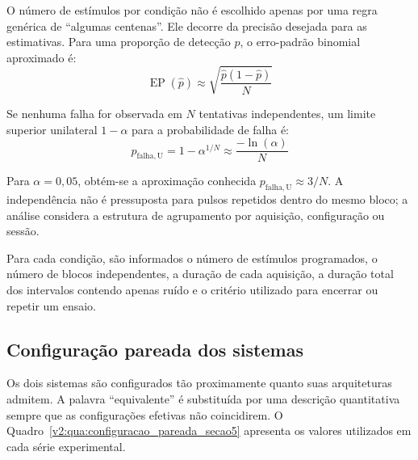 O número de estímulos por condição não é escolhido apenas por uma regra genérica de ``algumas centenas''. Ele decorre da precisão desejada para as estimativas. Para uma proporção de detecção \(p\), o erro-padrão binomial aproximado é:
\begin{equation}
	\operatorname{EP}\left(\widehat{p}\right) \approx \sqrt{\frac{\widehat{p}\left(1-\widehat{p}\right)}{N}}
	\label{v2:eq:erro_padrao_deteccao}
\end{equation}

Se nenhuma falha for observada em \(N\) tentativas independentes, um limite superior unilateral \(1-\alpha\) para a probabilidade de falha é:
\begin{equation}
	p_{\mathrm{falha,U}} = 1-\alpha^{1/N} \approx \frac{-\ln\left(\alpha\right)}{N}
	\label{v2:eq:limite_zero_falhas}
\end{equation}

Para \(\alpha=0{,}05\), obtém-se a aproximação conhecida \(p_{\mathrm{falha,U}}\approx 3/N\). A independência não é pressuposta para pulsos repetidos dentro do mesmo bloco; a análise considera a estrutura de agrupamento por aquisição, configuração ou sessão.

Para cada condição, são informados o número de estímulos programados, o número de blocos independentes, a duração de cada aquisição, a duração total dos intervalos contendo apenas ruído e o critério utilizado para encerrar ou repetir um ensaio.

\subsection{Configuração pareada dos sistemas}
\label{v2:subsec:configuracao_pareada}

Os dois sistemas são configurados tão proximamente quanto suas arquiteturas admitem. A palavra ``equivalente'' é substituída por uma descrição quantitativa sempre que as configurações efetivas não coincidirem. O Quadro~\ref{v2:qua:configuracao_pareada_secao5} apresenta os valores utilizados em cada série experimental.

